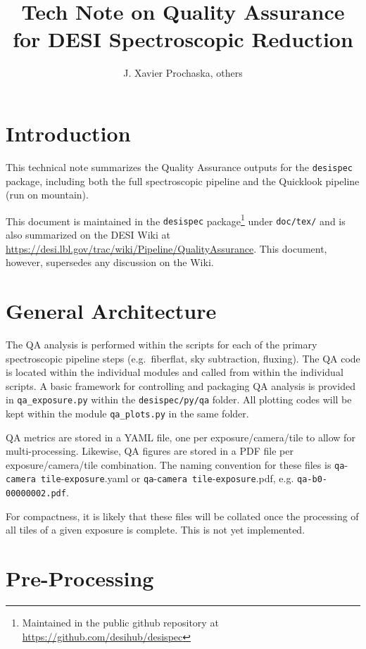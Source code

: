 \documentclass[12pt]{article}
\title{Tech Note on Quality Assurance for DESI Spectroscopic Reduction \\
\vspace{5mm}{\large\bf DESI-doc-XXX-v1}}
\author{J. Xavier Prochaska, others}
\begin{document}
\maketitle

\section{Introduction}

This technical note summarizes the Quality Assurance outputs for the
{\tt desispec} package, including both the full spectroscopic pipeline
and the Quicklook pipeline (run on mountain).

This document is maintained in the {\tt desispec} package\footnote{Maintained in the public github repository at \url{https://github.com/desihub/desispec}} under {\tt doc/tex/}
and is also summarized on the DESI Wiki at 
\url{https://desi.lbl.gov/trac/wiki/Pipeline/QualityAssurance}. 
This document, however, supersedes any discussion on 
the Wiki.

\section{General Architecture}

The QA analysis is performed within the scripts for each
of the primary spectroscopic pipeline steps (e.g.\ fiberflat,
sky subtraction, fluxing).   The QA code is located within 
the individual modules and called from within the individual
scripts.  A basic framework for controlling and packaging
QA analysis is provided in {\tt qa\_exposure.py}
within the {\tt desispec/py/qa} folder.
All plotting codes will be kept within the module
{\tt qa\_plots.py} in the same folder.

QA metrics are stored
in a YAML file, one per exposure/camera/tile to allow for
multi-processing.  Likewise, QA figures are stored in a 
PDF file per exposure/camera/tile combination.
The naming convention for these files is 
{\tt qa}-{\tt camera tile}-{\tt exposure}.yaml or
{\tt qa}-{\tt camera tile}-{\tt exposure}.pdf, 
e.g. {\tt qa-b0-00000002.pdf}.

For compactness, it is likely that these files will be collated
once the processing of all tiles of a given exposure is complete.
This is not yet implemented.

\section{Pre-Processing}
\end{document}
